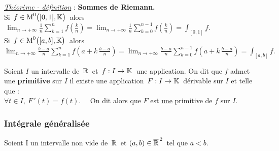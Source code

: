 \vspace*{1cm}

\underline{\emph{Théorème - définition}} : \textbf{Sommes de Riemann.}\vspace{0.1cm}\\
Si \(\,f\in \text{M}^0\bigl([0,1],\mathbb{K}\bigr)\,\) alors \(\,\displaystyle \lim_{n\to +\infty}\frac{1}{n}\sum_{k=1}^{n}f\!\left(\frac{k}{n}\right)=\lim_{n\to +\infty}\frac{1}{n}\sum_{k=0}^{n-1}f\!\left(\frac{k}{n}\right)=\int_{[0,1]}f.\)\vspace{0.3cm}\\
Si \(\,f\in \text{M}^0\bigl([a,b],\mathbb{K}\bigr)\,\) alors \(\displaystyle \lim_{n\to +\infty}\frac{b-a}{n}\sum_{k=1}^{n}f\!\left(a+k\,\frac{b-a}{n}\right)=\lim_{n\to +\infty}\frac{b-a}{n}\sum_{k=0}^{n-1}f\!\left(a+k\,\frac{b-a}{n}\right)=\int_{[a,b]}f.\)

\vspace{2cm}

Soient $I$ un intervalle de \(\,\mathbb{R}\,\) et \(\,f:I\to \mathbb{K}\,\) une application. On dit que $f$ admet une \textbf{primitive} sur $I$ \ssi il existe une application \(\,F:I\to \mathbb{K}\,\) dérivable sur $I$ et telle que : \vspace{0.1cm}\\
\(\forall t\in I,\ F\,'(t)=f(t).\quad \) On dit alors que $F$ est \underline{une} primitive de $f$ sur $I$.

\vspace{2cm}

\subsubsection{Intégrale généralisée}

\vspace{0.8cm}

\begin{center}
    Soient I un intervalle non vide de \(\,\mathbb{R}\,\) et \((a,b)\in \overline{\mathbb{R}}^{\,2}\,\) tel que $a<b$.
\end{center}

\vspace{0.7cm}

